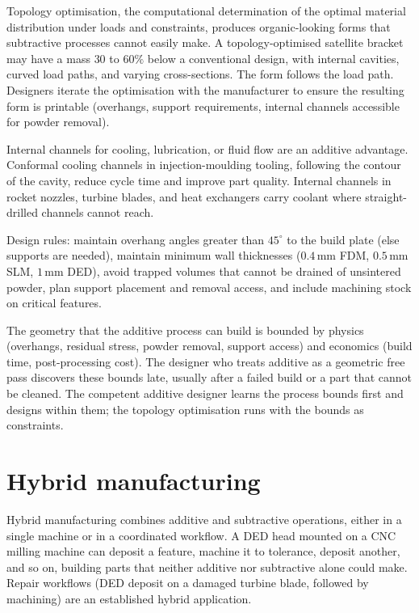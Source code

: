 Topology optimisation, the computational determination of the optimal material distribution under loads and constraints, produces organic-looking forms that subtractive processes cannot easily make. A topology-optimised satellite bracket may have a mass $30$ to $60\%$ below a conventional design, with internal cavities, curved load paths, and varying cross-sections. The form follows the load path. Designers iterate the optimisation with the manufacturer to ensure the resulting form is printable (overhangs, support requirements, internal channels accessible for powder removal).

Internal channels for cooling, lubrication, or fluid flow are an additive advantage. Conformal cooling channels in injection-moulding tooling, following the contour of the cavity, reduce cycle time and improve part quality. Internal channels in rocket nozzles, turbine blades, and heat exchangers carry coolant where straight-drilled channels cannot reach.

Design rules: maintain overhang angles greater than $45^\circ$ to the build plate (else supports are needed), maintain minimum wall thicknesses ($0.4\,\text{mm}$ FDM, $0.5\,\text{mm}$ SLM, $1\,\text{mm}$ DED), avoid trapped volumes that cannot be drained of unsintered powder, plan support placement and removal access, and include machining stock on critical features.

\begin{principle}
The geometry that the additive process can build is bounded by physics (overhangs, residual stress, powder removal, support access) and economics (build time, post-processing cost). The designer who treats additive as a geometric free pass discovers these bounds late, usually after a failed build or a part that cannot be cleaned. The competent additive designer learns the process bounds first and designs within them; the topology optimisation runs with the bounds as constraints.
\end{principle}

\section{Hybrid manufacturing}

Hybrid manufacturing combines additive and subtractive operations, either in a single machine or in a coordinated workflow. A DED head mounted on a CNC milling machine can deposit a feature, machine it to tolerance, deposit another, and so on, building parts that neither additive nor subtractive alone could make. Repair workflows (DED deposit on a damaged turbine blade, followed by machining) are an established hybrid application.

